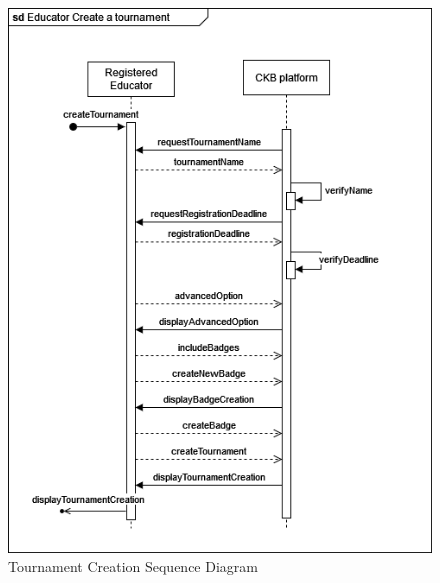 \begin{center}
    \begin{figure} [H]
        \begin{center}
            \includegraphics[width=0.9\linewidth]{Images/SequenceDiagrams/SD_10.png}
            \caption{Tournament Creation Sequence Diagram}
            \label{fig: tournament_creation_seq_diag}
        \end{center}
    \end{figure}
\end{center}


